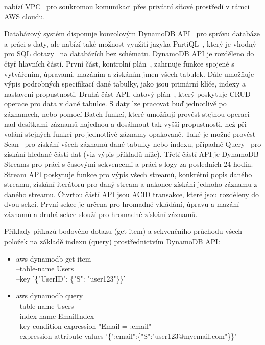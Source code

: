 \documentclass[czech,master,dept460,male,csharp,cpdeclaration]{diploma}
\begin{document}
nabízí VPC~\cite{vpc} pro soukromou komunikaci přes privátní síťové prostředí v rámci AWS cloudu.
	
	Databázový systém disponuje konzolovým DynamoDB API~\cite{api-dynamodb} pro správu databáze a práci s daty, ale nabízí také možnost využití jazyka PartiQL~\cite{partiql}, který je vhodný pro SQL dotazy~\cite{what-is-sql} na databázích bez schématu. DynamoDB API je rozděleno do čtyř hlavních částí. První část, kontrolní plán~\cite{control-plan-dynamodb, api-dynamodb}, zahrnuje funkce spojené s vytvářením, úpravami, mazáním a získáním jmen všech tabulek. Dále umožňuje výpis podrobných specifikací dané tabulky, jako jsou primární klíče, indexy a nastavení propustnosti. Druhá část API, datový plán~\cite{api-dynamodb}, který poskytuje CRUD operace pro data v dané tabulce. S daty lze pracovat buď jednotlivě po záznamech, nebo pomocí Batch funkcí, které umožňují provést stejnou operaci nad desítkami záznamů najednou a dosáhnout tak vyšší propustnosti, než při volání stejných funkcí pro jednotlivé záznamy opakovaně. Také je možné provést Scan~\cite{scan-dynamo} pro získání všech záznamů dané tabulky nebo indexu, případně Query~\cite{query-dynamo} pro získání hledané části dat (viz výpis příkladů níže). Třetí částí API je DynamoDB Streams pro práci s časovými sekvencemi a práci s logy za posledních 24 hodin. Stream API poskytuje funkce pro výpis všech streamů, konkrétní popis daného streamu, získání iterátoru pro daný stream a nakonec získání jednoho záznamu z daného streamu. Čtvrtou částí API jsou ACID transakce, které jsou rozděleny do dvou sekcí. První sekce je určena pro hromadné vkládání, úpravu a mazání záznamů a druhá sekce slouží pro hromadné získání záznamů.
	
	Příklady příkazů bodového dotazu (get-item) a sekvenčního průchodu všech položek na základě indexu (query) prostřednictvím DynamoDB API:
	
	\begin{itemize}
		\item aws dynamodb get-item \\
		--table-name Users	\\
		--key '\{"UserID": \{"S": "user123"\}\}'
		\item aws dynamodb query \\
		--table-name Users \\
		--index-name EmailIndex \\
		--key-condition-expression "Email = :email" \\
		--expression-attribute-values '\{":email":\{"S":"user123@myemail.com"\}\}'~\cite{query-dynamo, scan-dynamo}
	\end{itemize}
	
\end{document}
